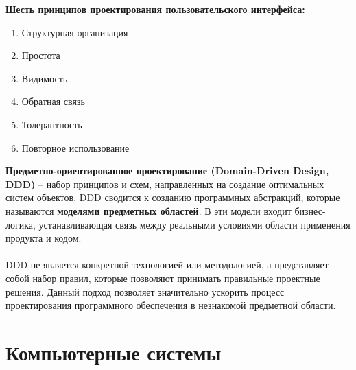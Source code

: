 \documentclass[a4paper, 12pt]{report}
\numberwithin{equation}{section}
\begin{document}
    \textbf{Шесть принципов проектирования пользовательского интерфейса:}
    \begin{enumerate}
        \item Структурная организация
        \item Простота
        \item Видимость
        \item Обратная связь
        \item Толерантность
        \item Повторное использование
    \end{enumerate}
\textbf{Предметно-ориентированное проектирование (Domain-Driven Design, DDD)} -- набор принципов и схем, направленных на создание оптимальных систем объектов. DDD сводится к созданию программных абстракций, которые называются \textbf{моделями предметных областей}. В эти модели входит бизнес-логика, устанавливающая связь между реальными условиями области применения продукта и кодом.
\\\\
DDD не является конкретной технологией или методологией, а представляет собой набор правил, которые позволяют принимать правильные проектные решения. Данный подход позволяет значительно ускорить процесс проектирования программного обеспечения в незнакомой предметной области.

\chapter{Компьютерные системы}
\end{document}
